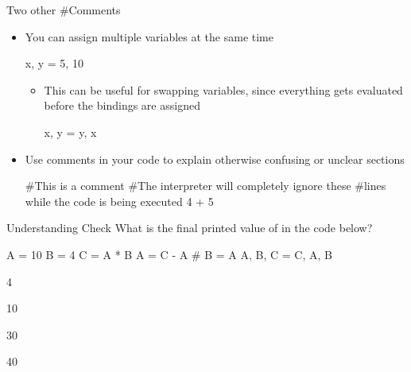 \documentclass[pdf, aspectratio=169, 12pt]{beamer}
\begin{document}
\begin{frame}[fragile]{Two other \#Comments}
	\vspace{5mm}
	\begin{itemize}
		\item You can assign multiple variables at the same time
			\begin{pythoncode}
				x, y = 5, 10	
			\end{pythoncode}
			\begin{itemize}
				\item This can be useful for swapping variables, since everything gets evaluated before the bindings are assigned
					\begin{pythoncode}
						x, y = y, x
					\end{pythoncode}
			\end{itemize}
		\item Use comments in your code to explain otherwise confusing or unclear sections
			\begin{pythoncode}
				#This is a comment
				#The interpreter will completely ignore these
				#lines while the code is being executed
				4 + 5
			\end{pythoncode}
	\end{itemize}
\end{frame}

\begin{frame}[fragile]{Understanding Check}
	What is the final printed value of  in the code below?
	\begin{pythoncode}[numbers=left]
		A = 10
		B = 4
		C = A * B
		A = C - A
		# B = A
		A, B, C = C, A, B
	\end{pythoncode}
	\begin{poll}
	\item 4
	\item 10
	\item 30
	\item 40
	\end{poll}
\end{frame}
\end{document}
